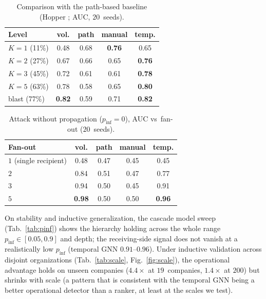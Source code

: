 \begin{table}[t]\centering
\begin{tabular}{lcccc}
\toprule
Level & vol. & path & manual & temp. \\
\midrule
$K{=}1$ (11\%)  & 0.48 & 0.68 & \textbf{0.76} & 0.65 \\
$K{=}2$ (27\%)  & 0.67 & 0.66 & 0.65 & \textbf{0.76} \\
$K{=}3$ (45\%)  & 0.72 & 0.61 & 0.61 & \textbf{0.78} \\
$K{=}5$ (63\%)  & 0.78 & 0.58 & 0.65 & \textbf{0.80} \\
blast (77\%)    & \textbf{0.82} & 0.59 & 0.71 & \textbf{0.82} \\
\bottomrule
\end{tabular}
\caption{Comparison with the path-based baseline (Hopper \citep{ho2021hopper}; AUC, $20$~seeds).}
\label{tab:hopper}
\end{table}
\begin{table}[t]\centering
\begin{tabular}{lcccc}
\toprule
Fan-out & vol. & path & manual & temp. \\
\midrule
$1$ (single recipient) & 0.48 & 0.47 & 0.45 & 0.45 \\
$2$ & 0.84 & 0.51 & 0.47 & 0.77 \\
$3$ & 0.94 & 0.50 & 0.45 & 0.91 \\
$5$ & \textbf{0.98} & 0.50 & 0.50 & \textbf{0.96} \\
\bottomrule
\end{tabular}
\caption{Attack without propagation ($p_\mathrm{inf}{=}0$), AUC vs~fan-out ($20$~seeds).}
\label{tab:blindspot}
\end{table}

On stability and inductive generalization, the cascade model sweep (Tab.~\ref{tab:pinf}) shows the
hierarchy holding across the whole range $p_\mathrm{inf}\!\in\![0.05,0.9]$ and depth; the receiving-side signal
does not vanish at a realistically low $p_\mathrm{inf}$ (temporal GNN $0.91$--$0.96$). Under inductive validation
across disjoint organizations (Tab.~\ref{tab:scale}, Fig.~\ref{fig:scale}), the operational advantage holds on
unseen companies ($4.4\times$ at $19$~companies, $1.4\times$ at $200$) but shrinks with scale (a pattern that is consistent with the temporal GNN being a better operational detector than a ranker, at least at the scales we test).

